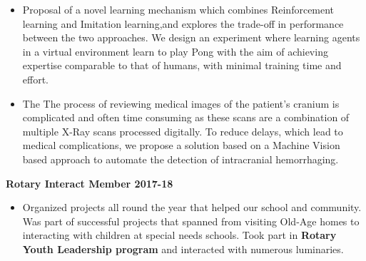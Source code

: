 \begin{itemize}
\item Proposal of a novel learning mechanism which combines Reinforcement learning and Imitation learning,and explores the trade-off in performance between the two approaches. We design an experiment where learning agents in a virtual environment learn to play Pong with the aim of achieving expertise comparable to that of humans, with minimal training time and effort.
\end{itemize}
\begin{itemize}
\item The The process of reviewing medical images of the patient’s cranium 
is complicated and often time consuming as these scans are a combination of multiple X-Ray scans processed digitally. To reduce delays, which lead to medical complications, we propose a solution based on a Machine Vision based approach to automate the detection of intracranial hemorrhaging.  
\end{itemize}
\smallskip
\begin{comment}
\cvproject{Portable Air Conditioner (09/2015 - 12/2015)}
\begin{itemize}
\item An Innovative approach to affordable air conditioning for user who cannot afford an A/C or the electricity costs, where the which targets the specific use of an A/C that is while sleeping, by cooling only the bed and its surroundings. A prototype for which was also made. Presented at CBSE Science Exhibition, state level on 17-19 Dec 2015.
\end{itemize}
\end{comment}

 


\large{\textbf{Rotary Interact Member 2017-18}}
\begin{itemize}
\item[\faTrophy]Organized projects all round the year that helped our school and community. Was part of successful projects that spanned from visiting Old-Age homes to interacting with children at special needs schools. Took part in \textbf{Rotary Youth Leadership program} and interacted with numerous luminaries.
\end{itemize}
